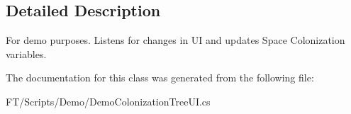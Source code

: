 \subsection{Detailed Description}
For demo purposes. Listens for changes in UI and updates Space Colonization variables. 



The documentation for this class was generated from the following file\+:\begin{DoxyCompactItemize}
\item 
F\+T/\+Scripts/\+Demo/Demo\+Colonization\+Tree\+U\+I.\+cs\end{DoxyCompactItemize}
